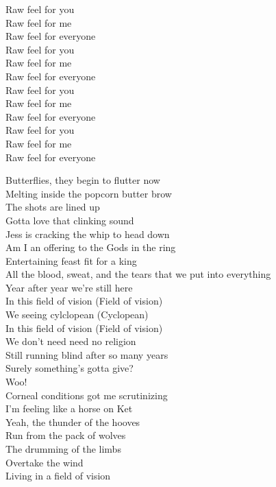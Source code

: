 Raw feel for you\\
Raw feel for me\\
Raw feel for everyone\\
Raw feel for you\\
Raw feel for me\\
Raw feel for everyone\\
Raw feel for you\\
Raw feel for me\\
Raw feel for everyone\\
Raw feel for you\\
Raw feel for me\\
Raw feel for everyone\\



Butterflies, they begin to flutter now\\
Melting inside the popcorn butter brow\\
The shots are lined up\\
Gotta love that clinking sound\\
Jess is cracking the whip to head down\\

Am I an offering to the Gods in the ring\\
Entertaining feast fit for a king\\
All the blood, sweat, and the tears that we put into everything\\
Year after year we're still here\\

In this field of vision (Field of vision)\\
We seeing cylclopean (Cyclopean)\\
In this field of vision (Field of vision)\\
We don't need need no religion\\

Still running blind after so many years\\
Surely something's gotta give?\\
Woo!\\
Corneal conditions got me scrutinizing\\
I'm feeling like a horse on Ket\\
Yeah, the thunder of the hooves\\
Run from the pack of wolves\\
The drumming of the limbs\\
Overtake the wind\\
Living in a field of vision\\

